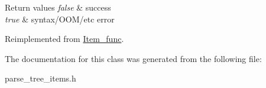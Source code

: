 \begin{DoxyRetVals}{Return values}
{\em false} & success \\
\hline
{\em true} & syntax/\+O\+O\+M/etc error \\
\hline
\end{DoxyRetVals}


Reimplemented from \mbox{\hyperlink{classItem__func_a6413cdbe7b14be77cc47462c9fc87ddb}{Item\+\_\+func}}.



The documentation for this class was generated from the following file\+:\begin{DoxyCompactItemize}
\item 
parse\+\_\+tree\+\_\+items.\+h\end{DoxyCompactItemize}
